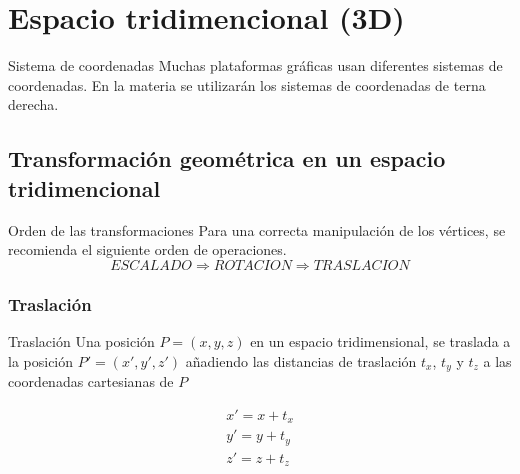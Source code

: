\documentclass[a4paper, twoside]{article}
\newcommand{\rutapaquetes}{./paquetes-apunte}
\begin{document}
\maketitle %

\tableofcontents %


\section{Espacio tridimencional (3D)}

\begin{definicion*}{Sistema de coordenadas}
	Muchas plataformas gráficas usan diferentes sistemas de coordenadas. En la materia se utilizarán los sistemas de coordenadas de terna derecha.
\end{definicion*}

\subsection{Transformación geométrica en un espacio tridimencional}

\begin{definicion*}{Orden de las transformaciones}
	Para una correcta manipulación de los vértices, se recomienda el siguiente orden de operaciones.
	\[
		ESCALADO \Rightarrow ROTACION \Rightarrow TRASLACION
	\]
\end{definicion*}

\subsubsection{Traslación}
\begin{definicion*}{Traslación}
	Una posición $P = (x, y, z)$ en un espacio tridimensional, se traslada a la posición $P' = (x', y', z')$ añadiendo las distancias de traslación $t_x$, $t_y$ y $t_z$ a las coordenadas cartesianas de $P$

	\begin{align*}
		x' = x + t_x \\
		y' = y + t_y \\
		z' = z + t_z
	\end{align*}
\end{definicion*}
\end{document}
